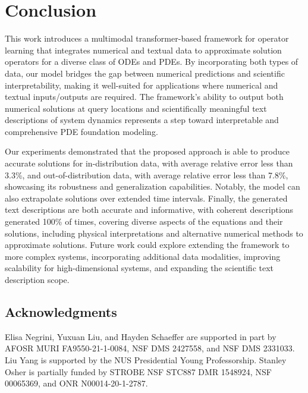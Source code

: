 \documentclass{article}
\begin{document}
\section{Conclusion}
This work introduces a multimodal transformer-based framework for operator learning that integrates numerical and textual data to approximate solution operators for a diverse class of ODEs and PDEs. By incorporating both types of data, our model bridges the gap between numerical predictions and scientific interpretability, making it well-suited for applications where numerical and textual inputs/outputs are required. The framework’s ability to output both numerical solutions at query locations and scientifically meaningful text descriptions of system dynamics represents a step toward interpretable and comprehensive PDE foundation modeling. 

Our experiments demonstrated that the proposed approach is able to produce accurate solutions for in-distribution data, with average relative error less than 3.3\%,  and out-of-distribution data, with average relative error less than 7.8\%, showcasing its robustness and generalization capabilities. Notably, the model can also extrapolate solutions over extended time intervals. Finally, the generated text descriptions are both accurate and informative, with coherent descriptions generated 100\% of times, covering diverse aspects of the equations and their solutions, including physical interpretations and alternative numerical methods to approximate solutions. Future work could explore extending the framework to more complex systems, incorporating additional data modalities, improving scalability for high-dimensional systems, and expanding the scientific text description scope.

\subsection*{Acknowledgments}

Elisa Negrini, Yuxuan Liu, and Hayden Schaeffer are supported in part by AFOSR MURI FA9550-21-1-0084, NSF DMS 2427558, and NSF DMS 2331033.
Liu Yang is supported by the NUS Presidential Young Professorship.
Stanley Osher is partially funded by STROBE NSF STC887
DMR 1548924,  NSF 00065369, and ONR N00014-20-1-2787.




\appendix


\end{document}
